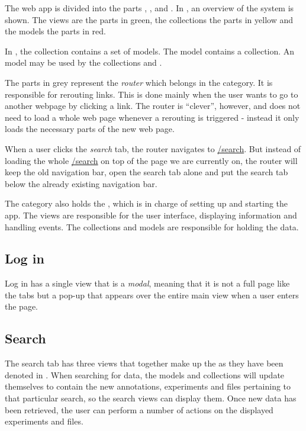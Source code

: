 The web app is divided into the parts , ,  and . In , an overview of the system is shown. The views are the parts in green, the collections the parts in yellow and the models the parts in red. 

\begin{example}
In , the collection  contains a set of  models. The model  contains a  collection. An  model may be used by the collections  and .
\end{example}

The parts in grey represent the \textit{router} which belongs in the  category. It is responsible for rerouting links. This is done mainly when the user wants to go to another webpage by clicking a link. The router is ``clever'', however, and does not need to load a whole web page whenever a rerouting is triggered - instead it only loads the necessary parts of the new web page.

\begin{example}
When a user clicks the \textit{search} tab, the router navigates to \url{/search}. But instead of loading the whole \url{/search} on top of the page we are currently on, the router will keep the old navigation bar, open the search tab alone and put the search tab below the already existing navigation bar.
\end{example}

The  category also holds the , which is in charge of setting up and starting the app. The views are responsible for the user interface, displaying information and handling events. The collections and models are responsible for holding the data.

\subsection{Log in}
Log in has a single view that is a \textit{modal}, meaning that it is not a full page like the tabs but a pop-up that appears over the entire main view when a user enters the page.

\label{sec:web_search}
\subsection{Search}
The search tab has three views that together make up the  as they have been denoted in . When searching for data, the models and collections will update themselves to contain the new annotations, experiments and files pertaining to that particular search, so the search views can display them. Once new data has been retrieved, the user can perform a number of actions on the displayed experiments and files. 

